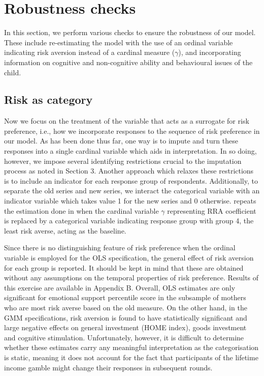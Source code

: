 \documentclass[emulatestandardclasses, 10pt, abstract = true]{scrartcl}
\begin{document}

\section{Robustness checks}
In this section, we perform various checks to ensure the robustness of our model. These include re-estimating the model with the use of an ordinal variable indicating risk aversion instead of a cardinal measure ($\gamma$), and incorporating information on cognitive and non-cognitive ability and behavioural issues of the child. 

\subsection{Risk as category}
Now we focus on the treatment of the variable that acts as a surrogate for risk preference, i.e., how we incorporate responses to the sequence of risk preference in our model. As has been done thus far, one way is to impute and turn these responses into a single cardinal variable which aids in interpretation. In so doing, however, we impose several identifying restrictions crucial to the imputation process as noted in Section 3. Another approach which relaxes these restrictions is to include an indicator for each response group of respondents. Additionally, to separate the old series and new series, we interact the categorical variable with an indicator variable which takes value 1 for the new series and 0 otherwise.  repeats the estimation done in  when the cardinal variable $\gamma$ representing RRA coefficient is replaced by a categorical variable indicating response group with group 4, the least risk averse, acting as the baseline. 

Since there is no distinguishing feature of risk preference when the ordinal variable is employed for the OLS specification, the general effect of risk aversion for each group is reported. It should be kept in mind that these are obtained without any assumptions on the temporal properties of risk preference. Results of this exercise are available in Appendix B. Overall, OLS estimates are only significant for emotional support percentile score in the subsample of mothers who are most risk averse based on the old measure. On the other hand, in the GMM specifications, risk  aversion is found to have statistically significant and large negative effects on general investment (HOME index), goods investment and cognitive stimulation. Unfortunately, however, it is difficult to determine whether these estimates carry any meaningful interpretation as the categorisation is static, meaning it does not account for the fact that participants of the lifetime income gamble might change their responses in subsequent rounds.
\end{document}
